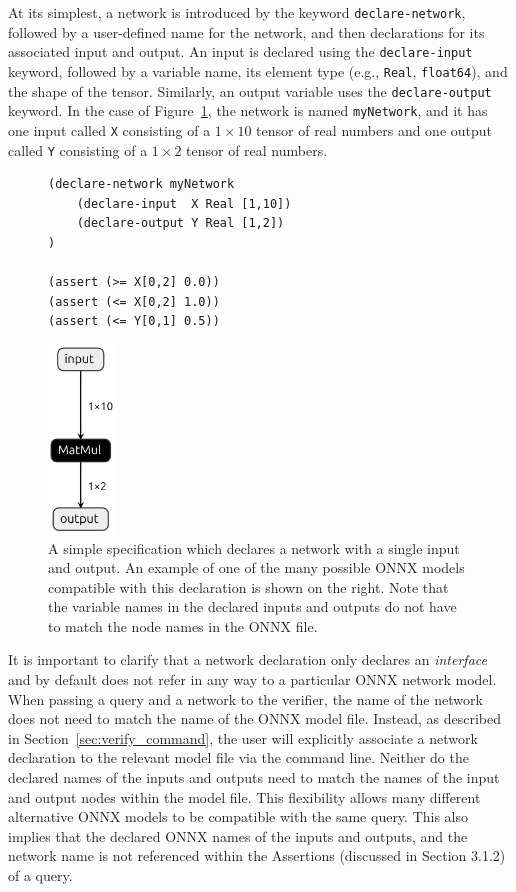  At its simplest, a network is introduced by the keyword \texttt{declare-network}, followed by a user-defined name for the network, and then declarations for its associated input and output. An input is declared using the \texttt{declare-input} keyword, followed by a variable name, its element type (e.g., \texttt{Real}, \texttt{float64}), 
and the shape of the tensor. Similarly, an output variable uses the \texttt{declare-output} keyword. In the case of Figure~\ref{fig:simple-query}, the network is named \texttt{myNetwork}, and it has one input called \texttt{X} consisting of a $1 \times 10$ tensor of real numbers and one output called \texttt{Y} consisting of a $1 \times 2$ tensor of real numbers. 
\begin{figure}[t]
    \begin{minipage}[c]{0.6\textwidth}
        \begin{lstlisting}[style=lbnf]
(declare-network myNetwork
    (declare-input  X Real [1,10])
    (declare-output Y Real [1,2])
)

(assert (>= X[0,2] 0.0))
(assert (<= X[0,2] 1.0))
(assert (<= Y[0,1] 0.5))\end{lstlisting}
    \end{minipage}%
    \begin{minipage}[c]{0.45\textwidth}
        \centering
        \includegraphics[height=5cm]{imgs/simple_net.onnx.png}
    \end{minipage}
    \caption{A simple \vnnlib{} specification which declares a network with a single input and output. An example of one of the many possible ONNX models compatible with this declaration is shown on the right. Note that the variable names in the declared inputs and outputs do not have to match the node names in the ONNX file.}
    \label{fig:simple-query}
\end{figure}


It is important to clarify that a network declaration only declares an \emph{interface} and by default does not refer in any way to a particular ONNX network model. When passing a query and a network to the verifier, the name of the network does not need to match the name of the ONNX model file. Instead, as described in Section~\ref{sec:verify_command}, the user will explicitly associate a network declaration to the relevant model file via the command line.
Neither do the declared names of the inputs and outputs need to match the names of the input and output nodes within the model file. This flexibility allows many different alternative ONNX models to be compatible with the same query. This also implies that the declared ONNX names of the inputs and outputs, and the network name is not referenced within the Assertions (discussed in Section 3.1.2) of a query.

